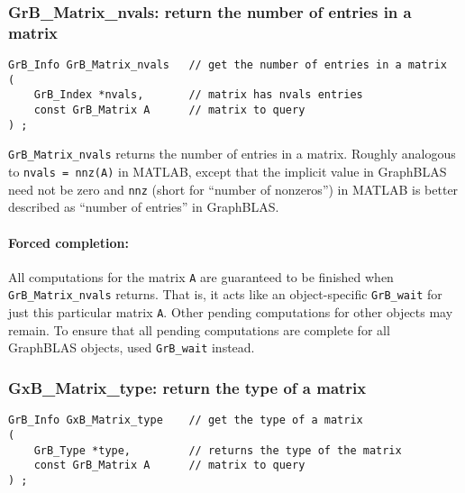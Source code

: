 \documentclass[12pt]{article}
\begin{document}
\subsubsection{{\sf GrB\_Matrix\_nvals:}        return the number of entries in a matrix}
\label{matrix_nvals}

\begin{mdframed}[userdefinedwidth=6in]
{\footnotesize
\begin{verbatim}
GrB_Info GrB_Matrix_nvals   // get the number of entries in a matrix
(
    GrB_Index *nvals,       // matrix has nvals entries
    const GrB_Matrix A      // matrix to query
) ;
\end{verbatim} } \end{mdframed}

\verb'GrB_Matrix_nvals' returns the number of entries in a matrix.  Roughly
analogous to \verb'nvals = nnz(A)' in MATLAB, except that the implicit value in
GraphBLAS need not be zero and \verb'nnz' (short for ``number of nonzeros'') in
MATLAB is better described as ``number of entries'' in GraphBLAS.

\paragraph{Forced completion:}
All computations for the matrix \verb'A' are guaranteed to be finished when
\verb'GrB_Matrix_nvals' returns.  That is, it acts like an object-specific
\verb'GrB_wait' for just this particular matrix \verb'A'.  Other pending
computations for other objects may remain.  To ensure that all pending
computations are complete for all GraphBLAS objects, used \verb'GrB_wait'
instead.

\newpage
\subsubsection{{\sf GxB\_Matrix\_type:}         return the type of a matrix}
\label{matrix_type}

\begin{mdframed}[userdefinedwidth=6in]
{\footnotesize
\begin{verbatim}
GrB_Info GxB_Matrix_type    // get the type of a matrix
(
    GrB_Type *type,         // returns the type of the matrix
    const GrB_Matrix A      // matrix to query
) ;
\end{verbatim} } \end{mdframed}
\end{document}
